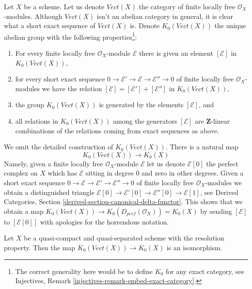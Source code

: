\noindent
Let $X$ be a scheme. Let us denote $\textit{Vect}(X)$ the category
of finite locally free $\mathcal{O}_X$-modules. Although
$\textit{Vect}(X)$ isn't an abelian category in general, it
is clear what a short exact sequence of $\textit{Vect}(X)$ is.
Denote $K_0(\textit{Vect}(X))$ the unique abelian group with the
following properties\footnote{The correct generality here
would be to define $K_0$ for any exact category, see
Injectives, Remark \ref{injectives-remark-embed-exact-category}.}:
\begin{enumerate}
\item For every finite locally free $\mathcal{O}_X$-module $\mathcal{E}$ there
is given an element $[\mathcal{E}]$ in $K_0(\textit{Vect}(X))$,
\item for every short exact sequence
$0 \to \mathcal{E}' \to \mathcal{E} \to \mathcal{E}'' \to 0$
of finite locally free $\mathcal{O}_X$-modules we have the relation
$[\mathcal{E}] = [\mathcal{E}'] + [\mathcal{E}'']$ in $K_0(\textit{Vect}(X))$,
\item the group $K_0(\textit{Vect}(X))$ is generated by the elements
$[\mathcal{E}]$, and
\item all relations in $K_0(\textit{Vect}(X))$ among the generators
$[\mathcal{E}]$ are $\mathbf{Z}$-linear combinations
of the relations coming from exact sequences as above.
\end{enumerate}
We omit the detailed construction of $K_0(\textit{Vect}(X))$.
There is a natural map
$$
K_0(\textit{Vect}(X)) \longrightarrow K_0(X)
$$
Namely, given a finite locally free $\mathcal{O}_X$-module $\mathcal{E}$
let us denote $\mathcal{E}[0]$ the perfect complex on $X$ which has
$\mathcal{E}$ sitting in degree $0$ and zero in other degrees.
Given a short exact sequence
$0 \to \mathcal{E} \to \mathcal{E}' \to \mathcal{E}'' \to 0$ of finite
locally free $\mathcal{O}_X$-modules we obtain a distinguished triangle
$\mathcal{E}[0] \to \mathcal{E}'[0] \to \mathcal{E}''[0] \to \mathcal{E}[1]$,
see Derived Categories, Section \ref{derived-section-canonical-delta-functor}.
This shows that we obtain a map
$K_0(\textit{Vect}(X)) \to K_0(D_{perf}(\mathcal{O}_X)) = K_0(X)$
by sending $[\mathcal{E}]$ to $[\mathcal{E}[0]]$
with apologies for the horrendous notation.

\begin{lemma}
\label{lemma-K-is-old-K}
Let $X$ be a quasi-compact and quasi-separated scheme with the
resolution property. Then the map $K_0(\textit{Vect}(X)) \to K_0(X)$
is an isomorphism.
\end{lemma}

